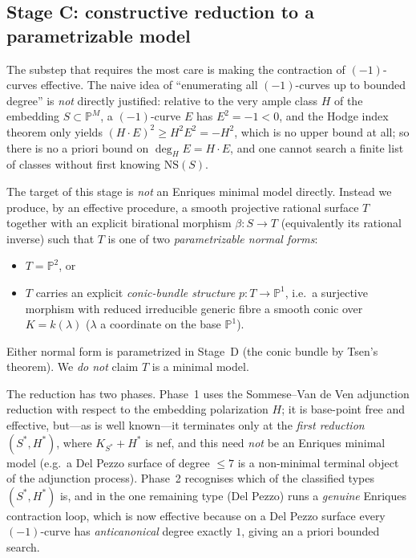 \documentclass{amsart}
\theoremstyle{plain}
\theoremstyle{definition}
\newcommand{\PP}{\mathbb{P}}
\begin{document}
\subsection{Stage C: constructive reduction to a parametrizable model}

The substep that requires the most care is making the contraction of
$(-1)$-curves effective.  The naive idea of ``enumerating all $(-1)$-curves up to
bounded degree'' is \emph{not} directly justified: relative to the very ample
class $H$ of the embedding $S\subset\PP^M$, a $(-1)$-curve $E$ has $E^2=-1<0$, and
the Hodge index theorem only yields $(H\cdot E)^2\ge H^2E^2=-H^2$, which is no
upper bound at all; so there is no a priori bound on $\deg_H E=H\cdot E$, and one
cannot search a finite list of classes without first knowing
$\mathrm{NS}(S)$.

The target of this stage is \emph{not} an Enriques minimal model directly.
Instead we produce, by an effective procedure, a smooth projective rational
surface $T$ together with an explicit birational morphism $\beta\colon S\to T$
(equivalently its rational inverse) such that $T$ is one of two
\emph{parametrizable normal forms}:
\begin{itemize}
\item[(N1)] $T=\PP^2$, or
\item[(N2)] $T$ carries an explicit \emph{conic-bundle structure}
$p\colon T\to\PP^1$, i.e.\ a surjective morphism with reduced irreducible generic
fibre a smooth conic over $K=k(\lambda)$ ($\lambda$ a coordinate on the base
$\PP^1$).
\end{itemize}
Either normal form is parametrized in Stage~D (the conic bundle by Tsen's
theorem).  We \emph{do not} claim $T$ is a minimal model.

The reduction has two phases.  Phase~1 uses the Sommese--Van de Ven adjunction
reduction with respect to the embedding polarization $H$; it is base-point free
and effective, but---as is well known---it terminates only at the \emph{first
reduction} $(S^\ast,H^\ast)$, where $K_{S^\ast}+H^\ast$ is nef, and this need
\emph{not} be an Enriques minimal model (e.g.\ a Del Pezzo surface of degree
$\le7$ is a non-minimal terminal object of the adjunction process).  Phase~2
recognises which of the classified types $(S^\ast,H^\ast)$ is, and in the one
remaining type (Del Pezzo) runs a \emph{genuine} Enriques contraction loop,
which is now effective because on a Del Pezzo surface every $(-1)$-curve has
\emph{anticanonical} degree exactly $1$, giving an a priori bounded search.
\end{document}
